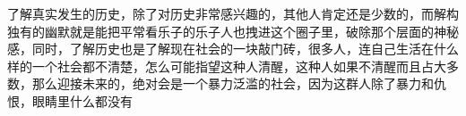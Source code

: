 \begin{zhihuanswer}
了解真实发生的历史，除了对历史非常感兴趣的，其他人肯定还是少数的，而解构独有的幽默就是能把平常看乐子的乐子人也拽进这个圈子里，破除那个层面的神秘感，同时，了解历史也是了解现在社会的一块敲门砖，很多人，连自己生活在什么样的一个社会都不清楚，怎么可能指望这种人清醒，这种人如果不清醒而且占大多数，那么迎接未来的，绝对会是一个暴力泛滥的社会，因为这群人除了暴力和仇恨，眼睛里什么都没有
\end{zhihuanswer}

